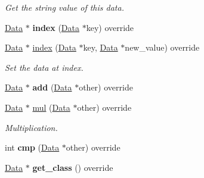 \begin{DoxyCompactItemize}
\begin{DoxyCompactList}\small\item\em Get the string value of this data. \end{DoxyCompactList}\item 
\hyperlink{classcreek_1_1_data}{Data} $\ast$ {\bfseries index} (\hyperlink{classcreek_1_1_data}{Data} $\ast$key) override\hypertarget{classcreek_1_1_string_a8810e29c3db309c1060d90bc93e2c593}{}\label{classcreek_1_1_string_a8810e29c3db309c1060d90bc93e2c593}

\item 
\hyperlink{classcreek_1_1_data}{Data} $\ast$ \hyperlink{classcreek_1_1_string_a827ca7fefbae2f8ae165ec97781368af}{index} (\hyperlink{classcreek_1_1_data}{Data} $\ast$key, \hyperlink{classcreek_1_1_data}{Data} $\ast$new\+\_\+value) override\hypertarget{classcreek_1_1_string_a827ca7fefbae2f8ae165ec97781368af}{}\label{classcreek_1_1_string_a827ca7fefbae2f8ae165ec97781368af}

\begin{DoxyCompactList}\small\item\em Set the data at index. \end{DoxyCompactList}\item 
\hyperlink{classcreek_1_1_data}{Data} $\ast$ {\bfseries add} (\hyperlink{classcreek_1_1_data}{Data} $\ast$other) override\hypertarget{classcreek_1_1_string_a3ab3dc6464a46bcf4ad75546c5a82402}{}\label{classcreek_1_1_string_a3ab3dc6464a46bcf4ad75546c5a82402}

\item 
\hyperlink{classcreek_1_1_data}{Data} $\ast$ \hyperlink{classcreek_1_1_string_a12e6976d9a52bbd406f2a28955504fce}{mul} (\hyperlink{classcreek_1_1_data}{Data} $\ast$other) override\hypertarget{classcreek_1_1_string_a12e6976d9a52bbd406f2a28955504fce}{}\label{classcreek_1_1_string_a12e6976d9a52bbd406f2a28955504fce}

\begin{DoxyCompactList}\small\item\em Multiplication. \end{DoxyCompactList}\item 
int {\bfseries cmp} (\hyperlink{classcreek_1_1_data}{Data} $\ast$other) override\hypertarget{classcreek_1_1_string_a89b08e12b1576748580098e3a35c121e}{}\label{classcreek_1_1_string_a89b08e12b1576748580098e3a35c121e}

\item 
\hyperlink{classcreek_1_1_data}{Data} $\ast$ {\bfseries get\+\_\+class} () override\hypertarget{classcreek_1_1_string_a83bbc52d9196ba2eb9b28056e6c291ba}{}\label{classcreek_1_1_string_a83bbc52d9196ba2eb9b28056e6c291ba}

\end{DoxyCompactItemize}


